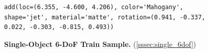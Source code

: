 \begin{figure}
\centering
{}
\begin{verbatim}
add(loc=(6.355, -4.600, 4.206), color='Mahogany', shape='jet', material='matte', rotation=(0.941, -0.337, 0.022, -0.303, -0.815, 0.493))
\end{verbatim}
\caption{\textbf{Single-Object 6-DoF Train Sample.} (\cref{sssec:single_6dof})}
\label{fig:code_single_6dof}
\end{figure}